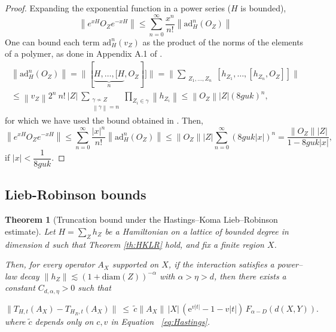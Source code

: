 \documentclass[11pt]{article}
\numberwithin{equation}{section}
\numberwithin{figure}{section}
\numberwithin{table}{section}
\theoremstyle{definition}
\theoremstyle{plain}
\newtheorem{thm}{Theorem}[section]
\theoremstyle{remark}
\newcommand{\La}{\Lambda}
\newcommand{\norm}[1]{\left\lVert#1\right\rVert}
\newcommand{\summ}[1]{\sum\limits_{\substack{ #1 }}}
\newcommand{\abs}[1]{\left \vert#1\right\vert}
\begin{document}
\begin{proof}
    Expanding the exponential function in a power series ($H$ is bounded),
    \begin{equation}
        \norm{e^{xH}O_Z e^{-xH}}\leq \sum_{n=0}^\infty \dfrac{x^n}{n!}\norm{\text{ad}_H^n(O_Z)}
    \end{equation}
    One can bound each term $\text{ad}_H^n(v_Z)$ as the product of the norms of the elements of a polymer, as done in Appendix A.1 of \cite{sanchez-segovia_high-temperature_2025}. 
    \begin{multline}
        \norm{\text{ad}_H^n(O_Z)}=\| [\underbrace{H,\dots ,[H}_{n},O_Z]]\|=\|\summ{Z_1,\dots,Z_n}[h_{Z_1},\dots,[h_{Z_n},O_Z]]\| \\
        \leq \norm{v_Z}2^n \ n! \ \abs{Z} \ \summ{\gamma \nsim Z\\\norm{\gamma}=n}\prod_{ Z_i \in \gamma}\norm{h_{Z_i}}\leq  \norm{O_Z} \abs{Z}(8g u  k)^n,
    \end{multline}
    for which we have used the bound obtained in \cite{sanchez-segovia_high-temperature_2025}. %
    Then,
    \begin{equation}
         \norm{e^{xH}O_Z e^{-xH}}\leq \sum_{n=0}^\infty \dfrac{\abs{x}^n}{n!}\norm{\text{ad}_H^n(O_Z)}\leq   \norm{O_Z} \abs{Z} \sum_{n=0}^\infty (8guk \abs{x})^n=\dfrac{\norm{O_Z}\abs{Z}}{1-8guk \abs{x}}, 
    \end{equation}
    if $\abs{x}<\dfrac{1}{8guk}$.
\end{proof}


\subsection{Lieb-Robinson bounds}
\medskip
\begin{thm}[Truncation bound under the Hastings--Koma Lieb--Robinson estimate]\label{thm:LRboundLongRangeAppendix}
Let $H = \sum_Z h_Z$ be a Hamiltonian on a lattice of bounded degree in dimension $d$ such that Theorem \ref{th:HKLR} hold, 
and fix a finite region $X$. 

Then, for every operator $A_X$ supported on $X$, if the interaction satisfies a power--law decay
$\|h_Z\| \lesssim (1+\mathrm{diam}(Z))^{-\alpha}$ with $\alpha>\eta>d$, 
then there exists a constant $C_{d,\alpha,\eta}>0$ such that

\begin{equation}
\big\|T_{H,t}(A_X) - T_{H_R,t}(A_X)\big\|
\ \leq\ \tilde c
\|A_X\|\, \abs{X}\,(\mathrm{e}^{v|t|}-1-v|t|)\,F_{\alpha-D}(d(X,Y)).
\label{eq:difTimeEvolutionsR}
\end{equation}
where $\tilde c$ depends only on $c,v$ in Equation ~\eqref{eq:Hastings}. 

\end{thm}
\end{document}
